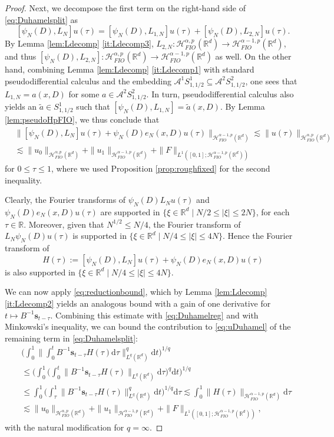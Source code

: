 \documentclass{amsart}
\numberwithin{equation}{section}
\theoremstyle{definition}
\newcommand{\R}{\mathbb{R}}
\newcommand{\Rd}{\mathbb{R}^{d}}
\newcommand{\Rn}{\mathbb{R}^{d}}
\newcommand {\A}{\mathcal{A}}
\newcommand {\HT}{\mathcal{H}}
\newcommand {\ud}{\mathrm{d}}
\newcommand {\sn}{\mathbf{s}}
\newcommand {\vanish}[1]{\relax}
\begin{document}
\begin{proof}
Next, we decompose the first term on the right-hand side of \eqref{eq:Duhamelsplit} as 
\[
[\psi_{N}(D),L_{N}]u(\tau)=[\psi_{N}(D),L_{1,N}]u(\tau)+[\psi_{N}(D),L_{2,N}]u(\tau).
\]
By Lemma \ref{lem:Ldecomp} \eqref{it:Ldecomp3}, $L_{2,N}:\HT^{\alpha,p}_{FIO}(\Rd)\to \HT^{\alpha-1,p}_{FIO}(\Rd)$, and thus $[\psi_{N}(D),L_{2,N}]:\HT^{\alpha,p}_{FIO}(\Rd)\to \HT^{\alpha-1,p}_{FIO}(\Rd)$ as well. On the other hand, combining Lemma \ref{lem:Ldecomp} \eqref{it:Ldecomp1} with standard pseudodifferential calculus and the embedding $\A^{1}S^{1}_{1,1/2}\subseteq \A^{2}S^{2}_{1,1/2}$, one sees that $L_{1,N}=a(x,D)$ for some $a\in \A^{2}S^{2}_{1,1/2}$.
In turn, pseudodifferential calculus also yields an $\tilde{a}\in S^{1}_{1,1/2}$ such that  $[\psi_{N}(D),L_{1,N}]=\tilde{a}(x,D)$. By Lemma \ref{lem:pseudoHpFIO}, we thus conclude that 
\begin{equation}\label{eq:Duhamelreg}
\begin{aligned}
&\|[\psi_{N}(D),L_{N}]u(\tau)+\psi_{N}(D)e_{N}(x,D)u(\tau)\|_{\HT^{\alpha-1,p}_{FIO}(\Rd)}\lesssim\|u(\tau)\|_{\HT^{\alpha,p}_{FIO}(\Rd)}\\
&\lesssim \|u_{0}\|_{\HT^{\alpha,p}_{FIO}(\R^d)}+\|u_{1}\|_{\HT^{\alpha-1,p}_{FIO}(\R^d)}+\|F\|_{L^{1}([0,1];\HT^{\alpha-1,p}_{FIO}(\R^d))}
\end{aligned}
\end{equation}
for $0\leq \tau\leq 1$, where we used Proposition \ref{prop:roughfixed} for the second inequality.


Clearly, the Fourier transforms of $\psi_{N}(D)L_{N}u(\tau)$ and $\psi_{N}(D)e_{N}(x,D)u(\tau)$ are supported in $\{\xi\in\Rd\mid N/2\leq |\xi|\leq 2N\}$, for each $\tau\in\R$. Moreover, given that $N^{1/2}\leq N/4$, the Fourier transform of $L_{N}\psi_{N}(D)u(\tau)$ is supported in $\{\xi\in\Rd\mid N/4\leq |\xi|\leq 4N\}$. Hence the Fourier transform of 
\[
H(\tau):=[\psi_{N}(D),L_{N}]u(\tau)+\psi_{N}(D)e_{N}(x,D)u(\tau)
\]
is also supported in $\{\xi\in\Rd\mid N/4\leq |\xi|\leq 4N\}$. 

We can now apply \eqref{eq:reductionbound}, which by Lemma \ref{lem:Ldecomp} \eqref{it:Ldecomp2} yields an analogous bound with a gain of one derivative for $t\mapsto B^{-1}\sn_{t-\tau}$. Combining this estimate with \eqref{eq:Duhamelreg} and with Minkowski's inequality, we can bound the contribution to \eqref{eq:uDuhamel} of the remaining term in \eqref{eq:Duhamelsplit}: 
\begin{align*}
&\Big(\int_{0}^{1}\Big\|\int_{0}^{t}B^{-1}\sn_{t-\tau}H(\tau)\ud\tau\Big\|_{L^{q}(\Rn)}^{q}\ud t\Big)^{1/q}\\
&\leq \Big(\int_{0}^{1}\Big(\int_{0}^{t}\|B^{-1}\sn_{t-\tau}H(\tau)\|_{L^{q}(\Rd)}\ud\tau\Big)^{q}\ud t\Big)^{1/q}\\
&\leq \int_{0}^{1}\Big(\int_{\tau}^{1}\|B^{-1}\sn_{t-\tau}H(\tau)\|_{L^{q}(\R^d)}^{q}\ud t\Big)^{1/q}\ud \tau\lesssim \int_{0}^{1}\|H(\tau)\|_{\HT^{\alpha-1,p}_{FIO}(\R^d)}\ud \tau\\
&\lesssim \|u_{0}\|_{\HT^{\alpha,p}_{FIO}(\R^d)}+\|u_{1}\|_{\HT^{\alpha-1,p}_{FIO}(\R^d)}+\|F\|_{L^{1}([0,1];\HT^{\alpha-1,p}_{FIO}(\R^d))},
\end{align*}
with the natural modification for $q=\infty$.
\vanish{
}
\end{proof}
\end{document}
